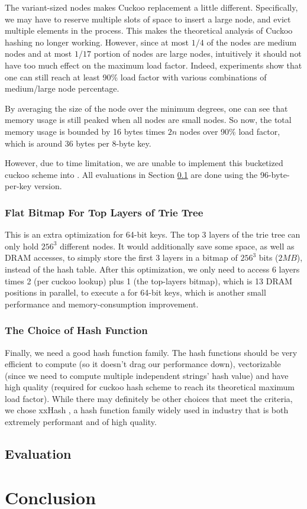 \documentclass[11pt, usletter]{article}
\begin{document}
The variant-sized nodes makes Cuckoo replacement a little different. 
Specifically, we may have to reserve multiple slots of space to insert a large node, 
and evict multiple elements in the process. 
This makes the theoretical analysis of Cuckoo hashing no longer working. 
However, since at most $1/4$ of the nodes are medium nodes 
and at most $1/17$ portion of nodes are large nodes, 
intuitively it should not have too much effect on the maximum load factor. 
Indeed, experiments show that one can still reach at least 90\% load factor with various combinations 
of medium/large node percentage.

By averaging the size of the node over the minimum degrees, 
one can see that memory usage is still peaked when all nodes are small nodes.
So now, the total memory usage is bounded by 16 bytes times $2n$ nodes over 90\% load factor, 
which is around 36 bytes per 8-byte key.

However, due to time limitation, we are unable to implement this bucketized cuckoo scheme 
into \MlpIndex. All evaluations in Section \ref{mlpindex_eval} are done using the 96-byte-per-key version. 

\subsubsection*{Flat Bitmap For Top Layers of Trie Tree}

This is an extra optimization for 64-bit keys.
The top 3 layers of the trie tree can only hold $256^3$ different nodes. 
It would additionally save some space, as well as DRAM accesses, to simply store the first 3 layers 
in a bitmap of $256^3$ bits ($2MB$), instead of the hash table. 
After this optimization, we only need to access 6 layers times 2 (per cuckoo lookup) plus 1 (the top-layers bitmap), 
which is 13 DRAM positions in parallel, to execute a \QueryLCP for 64-bit keys, 
which is another small performance and memory-consumption improvement.
 
\subsubsection*{The Choice of Hash Function}

Finally, we need a good hash function family.
The hash functions should be very efficient to compute (so it doesn't drag our performance down), 
vectorizable (since we need to compute multiple independent strings' hash value) 
and have high quality (required for cuckoo hash scheme to reach its theoretical maximum load factor).
While there may definitely be other choices that meet the criteria, 
we chose xxHash \cite{xxhash}, 
a hash function family widely used in industry that is both extremely performant and of high quality.

\subsection{Evaluation} \label{mlpindex_eval}


\section{Conclusion} \label{conclusion}

{}

\end{document}
